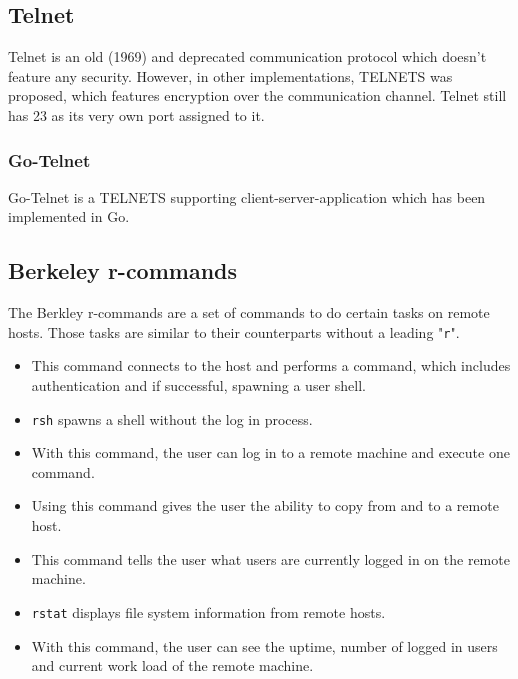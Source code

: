 \documentclass[10pt,a4paper,titlepage,twoside,english,final]{zhawreprt}
\begin{document}
\subsection{Telnet}\label{ssec:Telnet}
Telnet\citep{rfc15,rfc854} is an old (1969) and deprecated communication protocol which doesn't feature any security.
However, in other implementations, \gls{TELNETS} was proposed, which features encryption over the communication channel.
Telnet still has 23 as its very own \gls{port} assigned to it.
\subsubsection{Go-Telnet}
Go-Telnet\citep{gotelnet} is a \gls{TELNETS} supporting client-server-application which has been implemented in \gls{Go}.

\subsection{Berkeley r-commands}\label{ssec:BerkeleyRCommands}
The Berkley r-commands are a set of commands to do certain tasks on remote hosts.
Those tasks are similar to their counterparts without a leading "\texttt{r}".
\begin{itemize}
\item \cite{rlogin}

This command connects to the host and performs a \cite{login} command, which includes authentication and if successful, spawning a user \gls{shell}.
\item \cite{rsh}

\texttt{rsh} spawns a \gls{shell} without the log in process.
\item \cite{rexec}

With this command, the user can log in to a remote machine and execute one command.
\item \cite{rcp}

Using this command gives the user the ability to copy from and to a remote host.
\item \cite{rwho}

This command tells the user what users are currently logged in on the remote machine.
\item \cite{rstat}

\texttt{rstat} displays file system information from remote hosts.
\item \cite{ruptime}

With this command, the user can see the uptime, number of logged in users and current work load of the remote machine.
\end{itemize}
\end{document}
